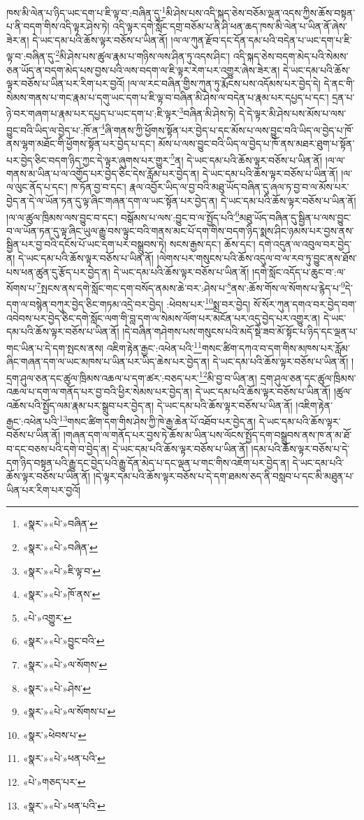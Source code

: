 ཁས་མི་ལེན་པ་ཉིད་ཡང་དག་པ་ཇི་ལྟ་བ་:བཞིན་དུ་\footnote{«སྣར་»«པེ་»བཞིན་}མི་ཤེས་པས་འདི་སྐད་ཅེས་བཅོམ་ལྡན་འདས་ཀྱིས་ཆོས་བསྟན་པ་ནི་བདག་གིས་འདི་ལྟར་ཤེས་ཏེ། འདི་ལྟར་དགེ་སློང་དགྲ་བཅོམ་པ་ནི་ཤི་ཕན་ཆད་ཁས་མི་ལེན་པ་ཡིན་ནོ་ཞེས་ཟེར་ན། དེ་ཡང་དམ་པའི་ཆོས་ལྟར་བཅོས་པ་ཡིན་ནོ། །ལ་ལ་ཀུན་རྫོབ་དང་དོན་དམ་པའི་བདེན་པ་ཡང་དག་པ་ཇི་ལྟ་བ་:བཞིན་དུ་\footnote{«སྣར་»«པེ་»བཞིན་}མི་ཤེས་པས་ཚུལ་རྣམ་པ་གཉིས་ལས་ཤིན་ཏུ་འདས་ཤིང་། འདི་སྐད་ཅེས་བདག་མེད་པའི་སེམས་ཅན་ཡོད་ན་བདག་མེད་པས་བྱས་པའི་ལས་བདག་ལ་ཇི་ལྟར་རེག་པར་འགྱུར་ཞེས་ཟེར་ན། དེ་ཡང་དམ་པའི་ཆོས་ལྟར་བཅོས་པ་ཡིན་པར་རིག་པར་བྱའོ། །ལ་ལ་རང་བཞིན་གྱིས་ཀུན་ཏུ་རྨོངས་པས་འདོམས་པར་བྱེད་དེ། དེ་ནང་གི་སེམས་གནས་པ་གང་རྣམ་པ་དགུ་ཡང་དག་པ་ཇི་ལྟ་བ་བཞིན་མི་ཤེས་ལ་བདེན་པ་རྣམ་པར་དཔྱད་པ་དང་། དྲན་པ་ཉེ་བར་གཞག་པ་རྣམ་པར་དཔྱད་པ་ཡང་དག་པ་:ཇི་ལྟར་\footnote{«སྣར་»«པེ་»ཇི་ལྟ་བ་}བཞིན་མི་ཤེས་ཏེ། དེ་དེ་ལྟར་མི་ཤེས་པས་མོས་པ་ལས་བྱུང་བའི་ཡིད་ལ་བྱེད་པ་:ཁོ་ན་\footnote{«སྣར་»«པེ་»ཁོ་ནས་}ཞི་གནས་ཀྱི་ཕྱོགས་སྟོན་པར་བྱེད་པ་དང་མོས་པ་ལས་བྱུང་བའི་ཡིད་ལ་བྱེད་པ་ཁོ་ནས་ལྷག་མཐོང་གི་ཕྱོགས་སྟོན་པར་བྱེད་པ་དང་། མོས་པ་ལས་བྱུང་བའི་ཡིད་ལ་བྱེད་པ་ཁོ་ནས་མཐར་ཐུག་པ་སྟོན་པར་བྱེད་ཅིང་བདག་ཉིད་ཀྱང་དེ་ལྟར་ཞུགས་པར་གྱུར་\footnote{«པེ་»འགྱུར་}ན། དེ་ཡང་དམ་པའི་ཆོས་ལྟར་བཅོས་པ་ཡིན་ནོ། །ལ་ལ་གནས་མ་ཡིན་པ་ལ་འགྱོད་པར་བྱེད་ཅིང་དེས་རློམ་པར་བྱེད་ན། དེ་ཡང་དམ་པའི་ཆོས་ལྟར་བཅོས་པ་ཡིན་ནོ། །ལ་ལ་ལུང་ནོད་པ་དང་། ཁ་ཏོན་བྱ་བ་དང་། རྣལ་འབྱོར་ཡིད་ལ་བྱ་བའི་མཐུ་ཡོད་བཞིན་དུ་ཞལ་ཏ་བྱ་བ་ལ་མོས་པར་བྱེད་ན་དེ་ལ་ཡོན་ཏན་དུ་ལྟ་ཞིང་གཞན་དག་ལ་ཡང་སྟོན་པར་བྱེད་ན། དེ་ཡང་དམ་པའི་ཆོས་ལྟར་བཅོས་པ་ཡིན་ནོ། །ལ་ལ་ཚུལ་ཁྲིམས་ལས་བྱུང་བ་དང་། བསྒོམས་པ་ལས་:བྱུང་བ་ལ་སྤྱོད་པའི་\footnote{«སྣར་»«པེ་»བྱུང་བའི་}མཐུ་ཡོད་བཞིན་དུ་སྦྱིན་པ་ལས་བྱུང་བ་ལ་ཡོན་ཏན་དུ་ལྟ་ཞིང་ཡུལ་རྒྱུ་བས་ལྟུང་བའི་གནས་མང་པོ་དག་གིས་བདག་ཉིད་སྨས་ཤིང་ཉམས་པར་བྱས་ནས་སྦྱིན་པར་བྱ་བའི་དངོས་པོ་ཡང་དག་པར་བསྒྲུབས་ཏེ། སངས་རྒྱས་དང་། ཆོས་དང་། དགེ་འདུན་ལ་འབུལ་བར་བྱེད་ན། དེ་ཡང་དམ་པའི་ཆོས་ལྟར་བཅོས་པ་ཡིན་ནོ། །ལེགས་པར་གསུངས་པའི་ཆོས་འདུལ་བ་ལ་རབ་ཏུ་བྱུང་ནས་ཐོས་པས་ཕན་ཚུན་དུ་རྩོད་པར་བྱེད་ན། དེ་ཡང་དམ་པའི་ཆོས་ལྟར་བཅོས་པ་ཡིན་ནོ། །དགེ་སློང་འདོད་པ་ཆུང་བ་:ལ་སོགས་པ་\footnote{«སྣར་»«པེ་»ལ་སོགས་}སྤངས་ནས་དགེ་སློང་གང་དག་བསོད་ནམས་ཆེ་བར་:ཤེས་པ་\footnote{«སྣར་»«པེ་»ཤེས་}ནས་:ཆོས་གོས་ལ་སོགས་པ་རྙེད་པ་\footnote{«སྣར་»«པེ་»ལ་སོགས་པ་}དེ་དག་ལ་བསྙེན་བཀུར་བྱེད་ཅིང་གཏམ་འདྲེ་བར་བྱེད། :ཕེབས་པར་\footnote{«སྣར་»ཕེབས་པ་}སྨྲ་བར་བྱེད། སོ་སོར་ཀུན་དགའ་བར་བྱེད་བག་འབེབས་པར་བྱེད་ཅིང་དགེ་སློང་ལག་གི་བླ་དག་ལ་སེམས་ལོག་པར་མངོན་པར་འདུ་བྱེད་པར་འགྱུར་ན། དེ་ཡང་དམ་པའི་ཆོས་ལྟར་བཅོས་པ་ཡིན་ནོ། །དེ་བཞིན་གཤེགས་པས་གསུངས་པའི་མདོ་སྡེ་ཟབ་མོ་སྟོང་པ་ཉིད་དང་ལྡན་པ་གང་ཡིན་པ་དེ་དག་སྤངས་ནས། འཇིག་རྟེན་རྒྱང་:འཕེན་པའི་\footnote{«སྣར་»«པེ་»ཕན་པའི་}གསང་ཚིག་དཀའ་བ་དག་གིས་མཁས་པར་རློམ་ཞིང་གཞན་དག་ལ་ཡང་མཁས་པ་ཡིན་པར་ཡིད་ཆེས་པར་བྱེད་ན། དེ་ཡང་དམ་པའི་ཆོས་ལྟར་བཅོས་པ་ཡིན་ནོ། །དྲག་ཤུལ་ཅན་དང་ཚུལ་ཁྲིམས་འཆལ་པ་དག་ཚར་:བཅད་པར་\footnote{«པེ་»གཅད་པར་}མི་བྱ་བ་ཡིན་ན། དྲག་ཤུལ་ཅན་དང་ཚུལ་ཁྲིམས་འཆལ་པ་དག་ལ་གནོད་པར་བྱ་བའི་ཕྱིར་སེམས་པར་བྱེད་ན། དེ་ཡང་དམ་པའི་ཆོས་ལྟར་བཅོས་པ་ཡིན་ནོ། །ཚུལ་འཆོས་པའི་སྤྱོད་ལམ་རྣམ་པར་སྒྲུབ་པར་བྱེད་ན། དེ་ཡང་དམ་པའི་ཆོས་ལྟར་བཅོས་པ་ཡིན་ནོ། །འཇིག་རྟེན་རྒྱང་:འཕེན་པའི་\footnote{«སྣར་»«པེ་»ཕན་པའི་}གསང་ཚིག་དག་གིས་ཤེས་ཀྱི་ཁེ་རྒྱ་ཆེན་པོ་འཐོབ་པར་བྱེད་ན། དེ་ཡང་དམ་པའི་ཆོས་ལྟར་བཅོས་པ་ཡིན་ནོ། །གཞན་དག་ལ་གནོད་པར་བྱས་ཏེ་ཆོས་མ་ཡིན་པས་ལོངས་སྤྱོད་དག་བསྒྲུབས་ནས་ཁ་ན་མ་ཐོ་བ་དང་བཅས་པའི་དགེ་བ་བྱེད་ན། དེ་ཡང་དམ་པའི་ཆོས་ལྟར་བཅོས་པ་ཡིན་ནོ། །དམ་པའི་ཆོས་ལྟར་བཅོས་པ་དེ་དག་ཉིད་བསྟན་པའི་རྒྱུ་དང་བྱེད་པའི་རྒྱུ་དོན་མེད་པ་དང་ལྡན་པ་གང་གིས་འཇོག་པར་བྱེད་ན། དེ་ཡང་དམ་པའི་ཆོས་ལྟར་བཅོས་པ་ཡིན་ནོ། །དེ་ལྟར་དམ་པའི་ཆོས་ལྟར་བཅོས་པ་དེ་དག་ཐམས་ཅད་ནི་བསླབ་པ་དང་མི་མཐུན་པ་ཡིན་པར་རིག་པར་བྱའོ། 